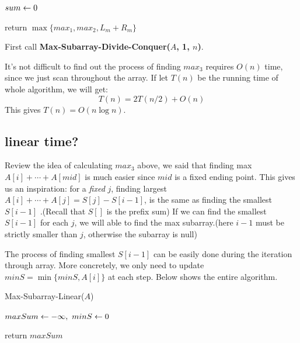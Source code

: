 \documentclass[11pt, a4paper]{COMP3711}
\begin{document}
\begin{spacing}{1.5}
\begin{algorithm}
        $sum\leftarrow 0$


        return $\max \{ max_1, max_2, L_m+R_m \}$
    \end{algorithm}

    First call {\bf Max-Subarray-Divide-Conquer($A$, 1, $n$)}.

    It's not difficult to find out the process of finding $max_3$
    requires $O(n)$ time, since we just scan throughout the array.
    If let $T(n)$ be the running time of whole algorithm, 
    we will get:
    $$T(n)=2T(n/2)+O(n)$$
    This gives $T(n)=O(n\log n)$.

    \subsection{linear time?}

    Review the idea of calculating $max_3$ above, we said that 
    finding max $A[i]+\cdots +A[mid]$ is much easier since $mid$
    is a fixed ending point. This gives us an inspiration:
    for a {\it fixed} $j$, finding largest $A[i]+\cdots +A[j]=
    S[j]-S[i-1]$, is the same as finding the smallest $S[i-1]$
    .(Recall that $S[]$ is the prefix sum)
    If we can find the smallest $S[i-1]$ for each $j$,
    we will able to find the max subarray.(here $i-1$ must 
    be strictly smaller than $j$, otherwise the subarray is null)

    The process of finding smallest $S[i-1]$ can be easily done 
    during the iteration through array. More concretely, 
    we only need to update $minS = \min\{minS, A[i]\}$ at each step.
    Below shows the entire algorithm.
    
    \begin{algorithm}
        \caption{Max-Subarray-Linear($A$)}
        $maxSum \leftarrow -\infty,\ minS\leftarrow 0$

        return $maxSum$
    \end{algorithm}


\end{spacing}
\end{document}

